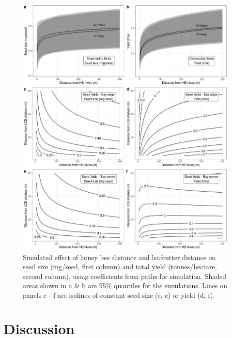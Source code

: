 \documentclass[12pt]{article} %
\begin{document}
\begin{figure}
    \centering
    \includegraphics[width=\textwidth,keepaspectratio=true]{../Figures/allYield.png}
    \caption{Simulated effect of honey bee distance and leafcutter distance on seed size (mg/seed, first column) and total yield (tonnes/hectare, second column), using coefficients from paths for simulation. Shaded areas shown in a \& b are 95\% quantiles for the simulations. Lines on panels c - f are isolines of constant seed size (c, e) or yield (d, f).}
    \label{fig:allYield}
\end{figure}

\section*{Discussion}
\end{document}
